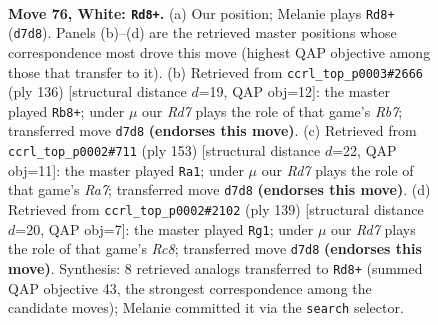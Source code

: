 \documentclass[11pt]{article}
\begin{document}
\clearpage

\begin{figure}[p]\centering
\begin{subfigure}{0.46\textwidth}\centering
\resizebox{\linewidth}{!}{%
\newchessgame
\chessboard[
  setfen={7k/3R4/8/8/p1p5/PrP4p/7P/6K1 w - - 2 76},
  showmover=false,
  pgfstyle=straightmove, color=movearrow, markmove={d7-d8}
]}
\caption{}
\end{subfigure}\hfill
\begin{subfigure}{0.46\textwidth}\centering
\resizebox{\linewidth}{!}{%
\newchessgame
\chessboard[
  setfen={5k2/1R6/4p1p1/4P2p/5P1P/4r3/6PK/8 w - - 5 69},
  showmover=false,
  pgfstyle=straightmove, color=movearrow, markmove={b7-b8}
]}
\caption{}
\end{subfigure}
\\[4pt]
\begin{subfigure}{0.46\textwidth}\centering
\resizebox{\linewidth}{!}{%
\newchessgame
\chessboard[
  setfen={8/5pk1/8/5PP1/3R1p2/5K2/r7/8 b - - 2 77},
  showmover=false,
  pgfstyle=straightmove, color=movearrow, markmove={a2-a1}
]}
\caption{}
\end{subfigure}\hfill
\begin{subfigure}{0.46\textwidth}\centering
\resizebox{\linewidth}{!}{%
\newchessgame
\chessboard[
  setfen={5k2/7R/5P2/6P1/p6p/P1p4K/8/2r5 b - - 0 70},
  showmover=false,
  pgfstyle=straightmove, color=movearrow, markmove={c1-g1}
]}
\caption{}
\end{subfigure}
\caption{\textbf{Move 76, White: \texttt{Rd8+}.} (a) Our position; Melanie plays \texttt{Rd8+} (\texttt{d7d8}). Panels (b)--(d) are the retrieved master positions whose correspondence most drove this move (highest QAP objective among those that transfer to it). (b) Retrieved from \texttt{ccrl\_top\_p0003\#2666} (ply 136) [structural distance $d$=19, QAP obj=12]: the master played \texttt{Rb8+}; under $\mu$ our \emph{Rd7} plays the role of that game's \emph{Rb7}; transferred move \texttt{d7d8} \textbf{(endorses this move)}. (c) Retrieved from \texttt{ccrl\_top\_p0002\#711} (ply 153) [structural distance $d$=22, QAP obj=11]: the master played \texttt{Ra1}; under $\mu$ our \emph{Rd7} plays the role of that game's \emph{Ra7}; transferred move \texttt{d7d8} \textbf{(endorses this move)}. (d) Retrieved from \texttt{ccrl\_top\_p0002\#2102} (ply 139) [structural distance $d$=20, QAP obj=7]: the master played \texttt{Rg1}; under $\mu$ our \emph{Rd7} plays the role of that game's \emph{Rc8}; transferred move \texttt{d7d8} \textbf{(endorses this move)}. Synthesis: 8 retrieved analogs transferred to \texttt{Rd8+} (summed QAP objective 43, the strongest correspondence among the candidate moves); Melanie committed it via the \texttt{search} selector.}
\label{fig:thought-m150}
\end{figure}
\end{document}
